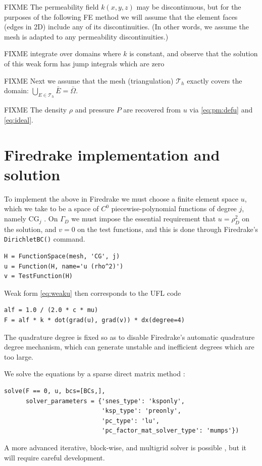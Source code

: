 \documentclass[11pt]{amsart}
\newcommand{\cT}{\mathcal{T}}
\begin{document}
FIXME The permeability field $k(x,y,z)$ may be discontinuous, but for the purposes of the following FE method we will assume that the element faces (edges in 2D) include any of its discontinuities.  (In other words, we assume the mesh is adapted to any permeability discontinuities.)

FIXME integrate over domains where $k$ is constant, and observe that the solution of this weak form has jump integrals which are zero

FIXME Next we assume that the mesh (triangulation) $\cT_h$ exactly covers the domain: $\bigcup_{E\in\cT_h} \bar E = \bar \Omega$.

FIXME The density $\rho$ and pressure $P$ are recovered from $u$ via \eqref{eq:pm:defu} and \eqref{eq:ideal}.


\section{Firedrake implementation and solution}

To implement the above in Firedrake we must choose a finite element space $u$, which we take to be a space of $C^0$ piecewise-polynomial functions of degree $j$, namely $\text{CG}_j$ \citep{Elman2014}.  On $\Gamma_D$ we must impose the essential requirement that $u=\rho_D^2$ on the solution, and $v=0$ on the test functions, and this is done through Firedrake's \verb|DirichletBC()| command.
\begin{Verbatim}[fontsize=\small,frame=lines]
H = FunctionSpace(mesh, 'CG', j)
u = Function(H, name='u (rho^2)')
v = TestFunction(H)
\end{Verbatim}
Weak form \eqref{eq:weaku} then corresponds to the UFL code
\begin{Verbatim}[fontsize=\small,frame=lines]
alf = 1.0 / (2.0 * c * mu)
F = alf * k * dot(grad(u), grad(v)) * dx(degree=4)
\end{Verbatim}
The quadrature degree is fixed so as to disable Firedrake's automatic quadrature degree mechanism, which can generate unstable and inefficient degrees which are too large.

We solve the equations by a sparse direct matrix method \citep{Amestoy2001}:
\begin{Verbatim}[fontsize=\small,frame=lines]
solve(F == 0, u, bcs=[BCs,],
      solver_parameters = {'snes_type': 'ksponly',
                           'ksp_type': 'preonly',
                           'pc_type': 'lu',
                           'pc_factor_mat_solver_type': 'mumps'})
\end{Verbatim}
A more advanced iterative, block-wise, and multigrid solver is possible \citep[e.g.][]{Bueler2021}, but it will require careful development.
\end{document}
